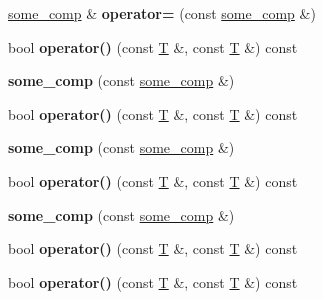 \begin{DoxyCompactItemize}
\item 
\mbox{\label{structsome__comp_a3cf31772d92b1481d71121d650f28a01}} 
\mbox{\hyperlink{structsome__comp}{some\+\_\+comp}} \& {\bfseries operator=} (const \mbox{\hyperlink{structsome__comp}{some\+\_\+comp}} \&)
\item 
\mbox{\label{structsome__comp_a6a7124af43ee189c025dee7d7482eaba}} 
bool {\bfseries operator()} (const \mbox{\hyperlink{struct_t}{T}} \&, const \mbox{\hyperlink{struct_t}{T}} \&) const
\item 
\mbox{\label{structsome__comp_acb6b551db492c34e1354464e12b57857}} 
{\bfseries some\+\_\+comp} (const \mbox{\hyperlink{structsome__comp}{some\+\_\+comp}} \&)
\item 
\mbox{\label{structsome__comp_a6a7124af43ee189c025dee7d7482eaba}} 
bool {\bfseries operator()} (const \mbox{\hyperlink{struct_t}{T}} \&, const \mbox{\hyperlink{struct_t}{T}} \&) const
\item 
\mbox{\label{structsome__comp_acb6b551db492c34e1354464e12b57857}} 
{\bfseries some\+\_\+comp} (const \mbox{\hyperlink{structsome__comp}{some\+\_\+comp}} \&)
\item 
\mbox{\label{structsome__comp_a6a7124af43ee189c025dee7d7482eaba}} 
bool {\bfseries operator()} (const \mbox{\hyperlink{struct_t}{T}} \&, const \mbox{\hyperlink{struct_t}{T}} \&) const
\item 
\mbox{\label{structsome__comp_acb6b551db492c34e1354464e12b57857}} 
{\bfseries some\+\_\+comp} (const \mbox{\hyperlink{structsome__comp}{some\+\_\+comp}} \&)
\item 
\mbox{\label{structsome__comp_a6a7124af43ee189c025dee7d7482eaba}} 
bool {\bfseries operator()} (const \mbox{\hyperlink{struct_t}{T}} \&, const \mbox{\hyperlink{struct_t}{T}} \&) const
\item 
\mbox{\label{structsome__comp_a6a7124af43ee189c025dee7d7482eaba}} 
bool {\bfseries operator()} (const \mbox{\hyperlink{struct_t}{T}} \&, const \mbox{\hyperlink{struct_t}{T}} \&) const
\item 

\end{DoxyCompactItemize}
